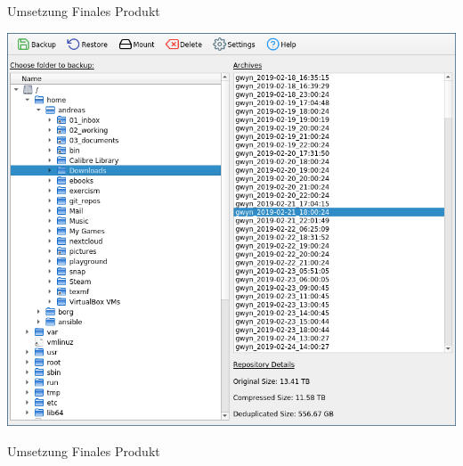 \documentclass[12pt, aspectratio=1610]{beamer}
\begin{document}
\begin{frame}[label={sec:org55d0100}]{Umsetzung}
\alert{Finales Produkt}

\begin{center}
\includegraphics[height=.8\textheight]{pictures/borgqt1.png}%
\end{center}
\end{frame}

\begin{frame}[label={sec:org0493ab9}]{Umsetzung}
\alert{Finales Produkt}

\begin{center}
%
\end{center}
\end{frame}
\end{document}
